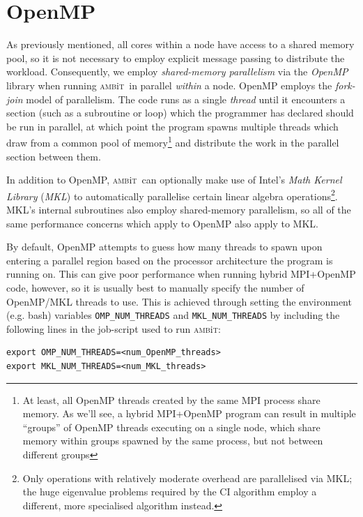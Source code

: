 \documentclass{report}
\newcommand{\ambit}{\textsc{amb}{\footnotesize i}\textsc{t}}
\begin{document}
\section{OpenMP}
\label{sec:OpenMP}
As previously mentioned, all cores within a node have access to a shared memory pool, so it is not
necessary to employ explicit message passing to distribute the workload. Consequently, we employ
\textit{shared-memory parallelism} via the \textit{OpenMP} library when running \ambit\ in parallel
\emph{within} a node. OpenMP employs the \textit{fork-join} model of parallelism. The code runs as a 
single \textit{thread} until it encounters a section (such as a subroutine or loop) which the programmer 
has declared should be run in parallel, at which point the program spawns multiple threads
which draw from a common pool of memory\footnote{At least, all OpenMP threads created by the same MPI 
process share memory. As we'll see, a hybrid MPI+OpenMP program can result in multiple ``groups'' of 
OpenMP threads executing on a single node, which share memory within groups spawned by the same process, 
but not between different groups} and distribute the work in the parallel section between them. 

In addition to OpenMP, \ambit\ can optionally make use of Intel's \textit{Math Kernel Library} 
(\textit{MKL}) to automatically parallelise certain linear algebra operations\footnote{Only operations 
with relatively moderate overhead are parallelised via MKL; the huge eigenvalue problems required by the
CI algorithm employ a different, more specialised algorithm instead.}. MKL's internal subroutines also
employ shared-memory parallelism, so all of the same performance concerns which apply to OpenMP also
apply to MKL.

By default, OpenMP attempts to guess how many threads to spawn upon entering a parallel region based on
the processor architecture the program is running on. This can give poor performance when running hybrid
MPI+OpenMP code, however, so it is usually best to manually specify the number of OpenMP/MKL threads to
use. This is achieved through setting the environment (e.g. bash) variables \texttt{OMP\_NUM\_THREADS} 
and \texttt{MKL\_NUM\_THREADS} by including the following lines in the job-script used to run \ambit:

\begin{verbatim}
export OMP_NUM_THREADS=<num_OpenMP_threads>
export MKL_NUM_THREADS=<num_MKL_threads>
\end{verbatim}
\end{document}
